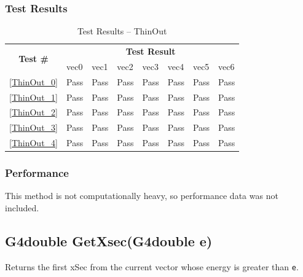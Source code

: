\documentclass[12pt]{article}
\begin{document}
	\subsubsection{Test Results}
		\begin{table}[H]
		\centering
		\caption{Test Results -- ThinOut}\label{ThinOut_acc}
		\begin{tabular}{clllllll}
		\toprule
		\multirow{2}{*}{\bf Test \#} & \multicolumn{7}{c}{\bf Test Result}\\
		& vec0 & vec1 & vec2 & vec3 & vec4 & vec5 & vec6\\\midrule
		\ref{ThinOut_0} & Pass & Pass & Pass & Pass & Pass & Pass & Pass\\
		\ref{ThinOut_1} & Pass & Pass & Pass & Pass & Pass & Pass & Pass\\
		\ref{ThinOut_2} & Pass & Pass & Pass & Pass & Pass & Pass & Pass\\
		\ref{ThinOut_3} & Pass & Pass & Pass & Pass & Pass & Pass & Pass\\
		\ref{ThinOut_4} & Pass & Pass & Pass & Pass & Pass & Pass & Pass\\
		\bottomrule
		\end{tabular}
		\end{table}

	\subsubsection{Performance}
		This method is not computationally heavy, so performance data was not included.



\subsection{G4double GetXsec(G4double e)}
	
	Returns the first xSec from the current vector whose energy is greater than \texttt{e}. 
	
\end{document}
